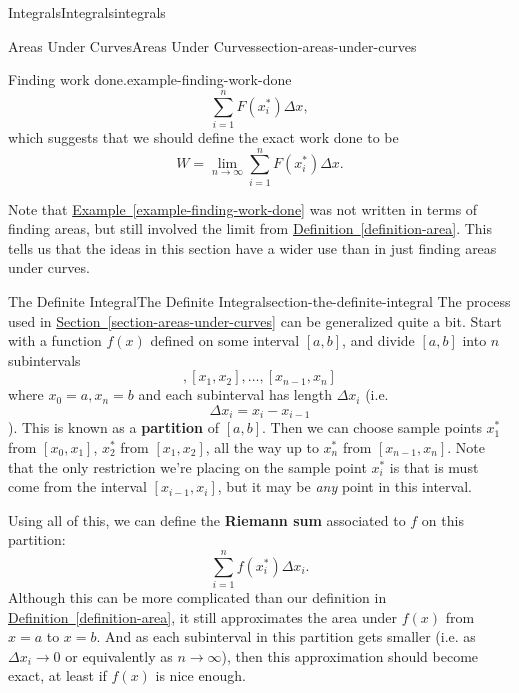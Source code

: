 \documentclass[oneside,10pt,]{book}
\newcommand{\terminology}[1]{\textbf{#1}}
\numberwithin{equation}{section}
\begin{document}
\begin{chapterptx}{Integrals}{}{Integrals}{}{}{integrals}
\begin{sectionptx}{Areas Under Curves}{}{Areas Under Curves}{}{}{section-areas-under-curves}
\begin{example}{Finding work done.}{example-finding-work-done}
\begin{equation*}
\sum_{i=1}^{n}F(x_{i}^{*})\Delta x,
\end{equation*}
which suggests that we should define the exact work done to be%
\begin{equation*}
W = \lim_{n\to\infty}\sum_{i=1}^{n}F(x_{i}^{*})\Delta x.
\end{equation*}
%
\end{example}
\hypertarget{p-424}{}%
Note that \hyperref[example-finding-work-done]{Example~\ref{example-finding-work-done}} was not written in terms of finding areas, but still involved the limit from \hyperref[definition-area]{Definition~\ref{definition-area}}. This tells us that the ideas in this section have a wider use than in just finding areas under curves.%
\end{sectionptx}
%
%
\typeout{************************************************}
\typeout{************************************************}
%
\begin{sectionptx}{The Definite Integral}{}{The Definite Integral}{}{}{section-the-definite-integral}
\hypertarget{p-425}{}%
The process used in \hyperref[section-areas-under-curves]{Section~\ref{section-areas-under-curves}} can be generalized quite a bit. Start with a function \(f(x)\) defined on some interval \([a,b]\), and divide \([a,b]\) into \(n\) subintervals%
\begin{equation*}
[x_{0},x_{1}], [x_{1},x_{2}],\ldots,[x_{n-1},x_{n}]
\end{equation*}
where \(x_{0} = a, x_{n} = b\) and each subinterval has length \(\Delta x_{i}\) (i.e.%
\begin{equation*}
\Delta x_{i} = x_{i} - x_{i-1}
\end{equation*}
). This is known as a \terminology{partition} of \([a,b]\). Then we can choose sample points \(x_{1}^{*}\) from \([x_{0},x_{1}]\), \(x_{2}^{*}\) from \([x_{1},x_{2}]\), all the way up to \(x_{n}^{*}\) from \([x_{n-1},x_{n}]\). Note that the only restriction we're placing on the sample point \(x_{i}^{*}\) is that is must come from the interval \([x_{i-1},x_{i}]\), but it may be \emph{any} point in this interval.%
\par
\hypertarget{p-426}{}%
Using all of this, we can define the \terminology{Riemann sum} associated to \(f\) on this partition:%
\begin{equation*}
\sum_{i=1}^{n}f(x_{i}^{*})\Delta x_{i}.
\end{equation*}
Although this can be more complicated than our definition in \hyperref[definition-area]{Definition~\ref{definition-area}}, it still approximates the area under \(f(x)\) from \(x=a\) to \(x=b\). And as each subinterval in this partition gets smaller (i.e. as \(\Delta x_{i}\to0\) or equivalently as \(n\to\infty\)), then this approximation should become exact, at least if \(f(x)\) is nice enough.%

\end{sectionptx}
\end{chapterptx}
\end{document}
